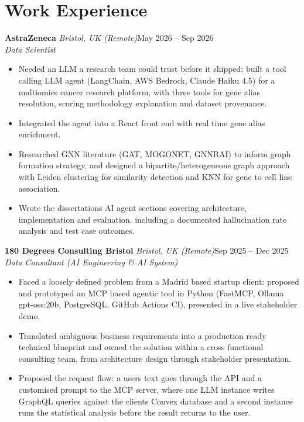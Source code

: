 \documentclass[a4paper,11pt]{article}
\newcommand{\role}[4]{%
  \textbf{#1}{\color{muted}\,\textperiodcentered\,\textit{#2}}\hfill{\color{muted}#3}\\
  \textit{#4}\par}
\newcommand{\gap}{\vspace{5pt}}
\begin{document}
\section{Work Experience}
\role{AstraZeneca}{Bristol, UK (Remote)}{May 2026 – Sep 2026}{Data Scientist}
\begin{itemize}
  \item Needed an LLM a research team could trust before it shipped: built a tool calling LLM agent (LangChain, AWS Bedrock, Claude Haiku 4.5) for a multiomics cancer research platform, with three tools for gene alias resolution, scoring methodology explanation and dataset provenance.
  \item Integrated the agent into a React front end with real time gene alias enrichment.
  \item Researched GNN literature (GAT, MOGONET, GNNRAI) to inform graph formation strategy, and designed a bipartite/heterogeneous graph approach with Leiden clustering for similarity detection and KNN for gene to cell line association.
  \item Wrote the dissertation\textquotesingle{}s AI agent sections covering architecture, implementation and evaluation, including a documented hallucination rate analysis and test case outcomes.
\end{itemize}
\gap
{}
\role{180 Degrees Consulting Bristol}{Bristol, UK (Remote)}{Sep 2025 – Dec 2025}{Data Consultant (AI Engineering \& AI System)}
\begin{itemize}
  \item Faced a loosely defined problem from a Madrid based startup client: proposed and prototyped an MCP based agentic tool in Python (FastMCP, Ollama gpt-oss:20b, PostgreSQL, GitHub Actions CI), presented in a live stakeholder demo.
  \item Translated ambiguous business requirements into a production ready technical blueprint and owned the solution within a cross functional consulting team, from architecture design through stakeholder presentation.
  \item Proposed the request flow: a user\textquotesingle{}s text goes through the API and a customised prompt to the MCP server, where one LLM instance writes GraphQL queries against the client\textquotesingle{}s Convex database and a second instance runs the statistical analysis before the result returns to the user.
\end{itemize}
\end{document}
